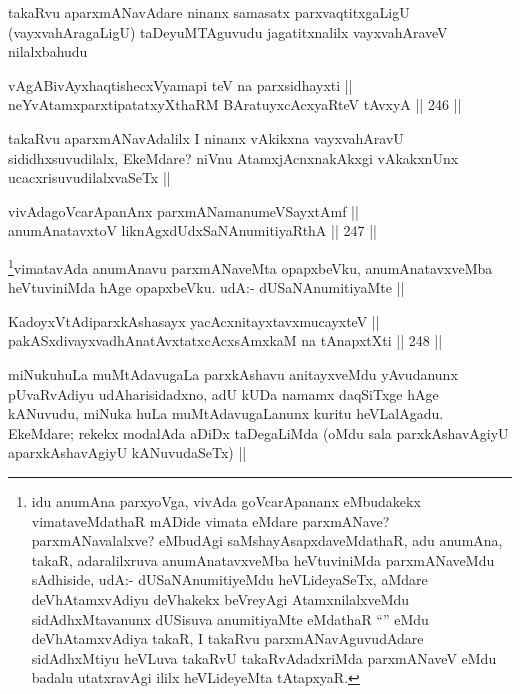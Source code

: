 \begin{artha}
takaRvu aparxmANavAdare ninanx samasatx parxvaqtitxgaLigU (vayxvahAragaLigU) taDeyuMTAguvudu jagatitxnalilx vayxvahAraveV nilalxbahudu
\end{artha}

\begin{shl}
vAgABivAyxhaqtishecxVyamapi teV na parxsidhayxti ||  \\
neYvA\s \s tamxparxtipatatxyXthaRM BAratuyxcAcxyaRteV tAvxyA ||  246 || 
\end{shl}

\begin{artha}
takaRvu aparxmANavAdalilx I ninanx vAkikxna vayxvahAravU sididhxsuvudilalx, EkeMdare? niVnu AtamxjAcnxnakAkxgi vAkakxnUnx ucacxrisuvudilalxvaSeTx ||
\end{artha}


\begin{shl}
vivAdagoVcarApanAnx parxmANamanumeVSayxtAmf || \\
anumAnatavxtoV liknAgxdUdxSaNAnumitiyaRthA ||  247 ||  
\end{shl}

\begin{artha}
\footnote{idu anumAna parxyoVga, vivAda goVcarApananx eMbudakekx vimataveMdathaR mADide vimata eMdare parxmANave? parxmANavalalxve? eMbudAgi saMshayAsapxdaveMdathaR, adu anumAna, takaR, adaralilxruva anumAnatavxveMba heVtuviniMda parxmANaveMdu sAdhiside, udA:- dUSaNAnumitiyeMdu heVLideyaSeTx, aMdare deVhAtamxvAdiyu deVhakekx beVreyAgi AtamxnilalxveMdu sidAdhxMtavanunx dUSisuva anumitiyaMte eMdathaR ``\stext'' eMdu deVhAtamxvAdiya takaR, I takaRvu parxmANavAguvudAdare sidAdhxMtiyu heVLuva takaRvU takaRvAdadxriMda parxmANaveV eMdu badalu utatxravAgi ililx heVLideyeMta tAtapxyaR.}vimatavAda anumAnavu parxmANaveMta opapxbeVku, anumAnatavxveMba heVtuviniMda hAge opapxbeVku. udA:- dUSaNAnumitiyaMte ||
\end{artha}

\begin{shl}
KadoyxVtAdiparxkAshasayx yacAcxnitayxtavxmucayxteV ||  \\
pakASxdivayxvadhAnatAvxtatxcAcxsAmxkaM na tAnapxtXti ||  248 || 
\end{shl}

\begin{artha}
miNukuhuLa muMtAdavugaLa parxkAshavu anitayxveMdu yAvudanunx pUvaRvAdiyu udAharisidadxno, adU kUDa namamx daqSiTxge hAge kANuvudu, miNuka huLa muMtAdavugaLanunx kuritu heVLalAgadu. EkeMdare; rekekx modalAda aDiDx taDegaLiMda (oMdu sala parxkAshavAgiyU aparxkAshavAgiyU kANuvudaSeTx) ||
\end{artha}

